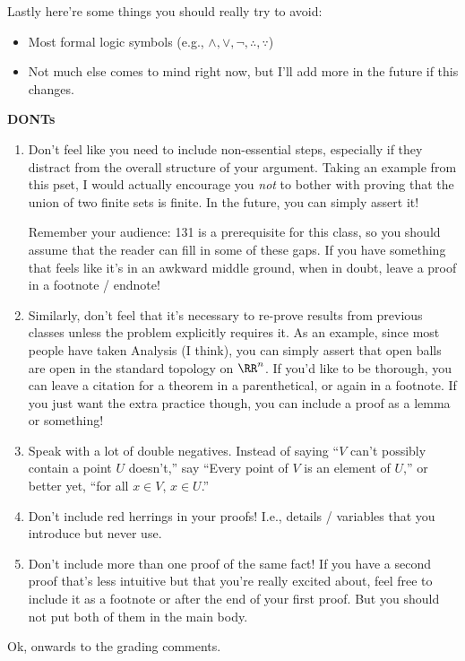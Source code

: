 \documentclass{fkpset}
\begin{document}
\begin{enumerate}[label=(\arabic*)]
    Lastly here're some things you should really try to avoid:
    \begin{itemize}
      \item Most formal logic symbols (e.g., $\land, \lor, \neg, \therefore,
        \because$)
      \item Not much else comes to mind right now, but I'll add more in the
        future if this changes.
    \end{itemize}
\end{enumerate}

\textbf{DONTs}
\begin{enumerate}[label=(\arabic*)]
  \item Don't feel like you need to include non-essential steps, especially if
    they distract from the overall structure of your argument. Taking an example
    from this pset, I would actually encourage you \emph{not} to bother with
    proving that the union of two finite sets is finite. In the future, you can
    simply assert it!

    Remember your audience: 131 is a prerequisite for this class, so you should
    assume that the reader can fill in some of these gaps. If you have something
    that feels like it's in an awkward middle ground, when in doubt, leave a
    proof in a footnote / endnote!
  \item Similarly, don't feel that it's necessary to re-prove results from
    previous classes unless the problem explicitly requires it. As an example,
    since most people have taken Analysis (I think), you can simply assert that
    open balls are open in the standard topology on $\RR^n$. If you'd like to be
    thorough, you can leave a citation for a theorem in a parenthetical, or
    again in a footnote. If you just want the extra practice though, you can
    include a proof as a lemma or something!
  \item Speak with a lot of double negatives. Instead of saying ``$V$ can't
    possibly contain a point $U$ doesn't,'' say ``Every point of $V$ is an
    element of $U$,'' or better yet, ``for all $x \in V$, $x \in U$.''
  \item Don't include red herrings in your proofs! I.e., details / variables
    that you introduce but never use.
  \item Don't include more than one proof of the same fact! If you have a second
    proof that's less intuitive but that you're really excited about, feel free
    to include it as a footnote or after the end of your first proof. But you
    should not put both of them in the main body.
  \end{enumerate}
Ok, onwards to the grading comments.
\end{document}
